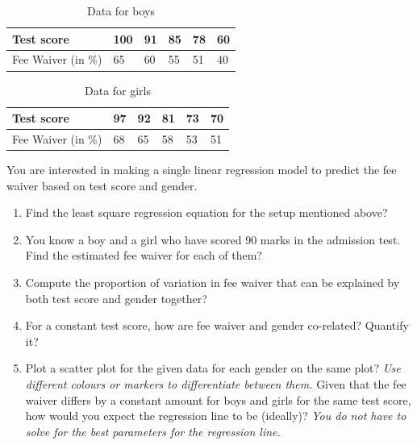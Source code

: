 \documentclass[12pt, oneside]{article}
\begin{document}
\begin{enumerate}
\begin{table}[h]
    \centering
    \begin{tabular}{l|lllll}
         Test score & 100 & 91 & 85 & 78 & 60 \\ \hline
         Fee Waiver (in \%)&  65& 60& 55& 51& 40 \\
    \end{tabular}
    \caption{Data for boys}
    \label{tab:q5_boys_data_1}
\end{table}

\begin{table}[h]
    \centering
    \begin{tabular}{l|lllll}
         Test score & 97 & 92 & 81 & 73 & 70 \\ \hline
         Fee Waiver (in \%)&  68& 65&  58&  53& 51 \\
    \end{tabular}
    \caption{Data for girls}
    \label{tab:q5_girls_data_1}
\end{table}

You are interested in making a single linear regression model to predict the fee waiver based on test score and gender. 

\begin{enumerate}
    \item Find the least square regression equation for the setup mentioned above? %
    \item You know a boy and a girl who have scored 90 marks in the admission test. Find the estimated fee waiver for each of them?
    \item Compute the proportion of variation in fee waiver that can be explained by both test score and gender together?
    \item For a constant test score, how are fee waiver and gender co-related? Quantify it?
    \item Plot a scatter plot for the given data for each gender on the same plot? \textit{Use different colours or markers to differentiate between them.} Given that the fee waiver differs by a constant amount for boys and girls for the same test score, how would you expect the regression line to be (ideally)? \textit{You do not have to solve for the best parameters for the regression line.}
    

\end{enumerate}
\end{enumerate}
\end{document}
